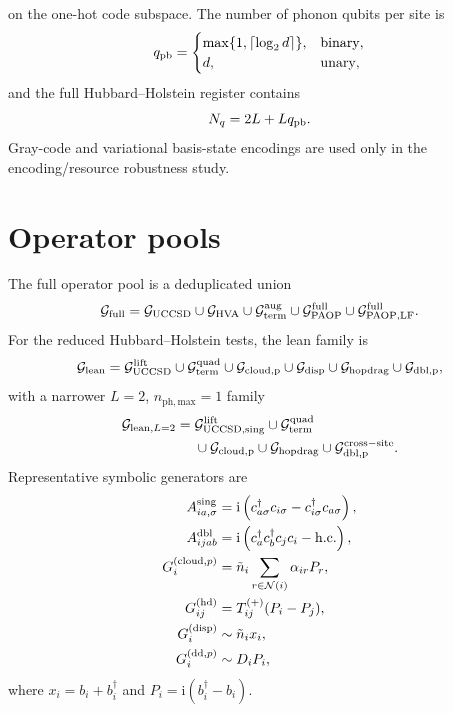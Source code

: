 \documentclass[
  reprint,
  amsmath,
  amssymb,
  aps,
  pra,
  nofootinbib,
  superscriptaddress,
  floatfix
]{revtex4-2}
\newcommand{\Gset}{\mathcal{G}}
\newcommand{\ii}{\mathrm{i}}
\newcommand{\phmax}{n_{\mathrm{ph,max}}}
\begin{document}
on the one-hot code subspace. The number of phonon qubits per site is
\begin{equation}
q_{\rm pb}=\begin{cases}
\max\{1,\lceil\log_2 d\rceil\}, & \text{binary},\\
d, & \text{unary},
\end{cases}
\label{eq:qpb}
\end{equation}
and the full Hubbard--Holstein register contains
\begin{equation}
N_q=2L+Lq_{\rm pb}.
\label{eq:nqubits}
\end{equation}
Gray-code and variational basis-state encodings are used only in the encoding/resource robustness study.

\section{Operator pools}
\label{app:pools}

The full operator pool is a deduplicated union
\begin{equation}
\Gset_{\rm full}=\Gset_{\rm UCCSD}\cup\Gset_{\rm HVA}\cup\Gset_{\rm term}^{\rm aug}\cup\Gset_{\rm PAOP}^{\rm full}\cup\Gset_{\rm PAOP,LF}^{\rm full}.
\label{eq:full_meta_pool}
\end{equation}
For the reduced Hubbard--Holstein tests, the lean family is
\begin{equation}
\Gset_{\rm lean}=\Gset_{\rm UCCSD}^{\rm lift}\cup\Gset_{\rm term}^{\rm quad}\cup\Gset_{\rm cloud,p}\cup\Gset_{\rm disp}\cup\Gset_{\rm hopdrag}\cup\Gset_{\rm dbl,p},
\label{eq:lean_pool}
\end{equation}
with a narrower $L=2$, $\phmax=1$ family
\begin{equation}
\begin{aligned}
\Gset_{{\rm lean},L=2}={}&\Gset_{\rm UCCSD,sing}^{\rm lift}\cup\Gset_{\rm term}^{\rm quad}\\
&\cup\Gset_{\rm cloud,p}\cup\Gset_{\rm hopdrag}\cup\Gset_{\rm dbl,p}^{\rm cross-site}.
\end{aligned}
\label{eq:l2_lean_pool}
\end{equation}
Representative symbolic generators are
\begin{align}
A_{ia,\sigma}^{\rm sing}&=\ii\left(c_{a\sigma}^{\dagger}c_{i\sigma}-c_{i\sigma}^{\dagger}c_{a\sigma}\right),
\nonumber\\
A_{ijab}^{\rm dbl}&=\ii\left(c_a^{\dagger}c_b^{\dagger}c_jc_i-\mathrm{h.c.}\right),
\nonumber\\
G_i^{({\rm cloud},p)}&=\tilde n_i\sum_{r\in\mathcal N(i)}\alpha_{ir}P_r,
\nonumber\\
G_{ij}^{({\rm hd})}&=T_{ij}^{(+)}(P_i-P_j),
\nonumber\\
G_i^{({\rm disp})}&\sim \tilde n_ix_i,
\nonumber\\
G_i^{({\rm dd},p)}&\sim D_iP_i,
\label{eq:pool_family_symbols}
\end{align}
where $x_i=b_i+b_i^{\dagger}$ and $P_i=\ii(b_i^{\dagger}-b_i)$.
\end{document}
